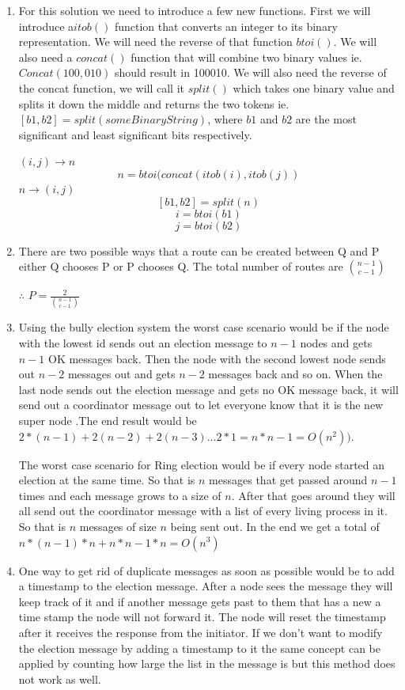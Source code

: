 \documentclass{article}
\begin{document}
\begin{enumerate}
\item For this solution we need to introduce a few new functions. First we will introduce a\( itob()\) function that converts an integer to its binary representation. We will need the reverse of that function \(btoi()\). We will also need a \(concat()\) function that will combine two binary values ie. \(Concat(100,010)\) should result in 100010.  We will also need the reverse of the concat function, we will call it \(split()\) which takes one binary value and splits it down the middle and returns the two tokens ie. \([b1,b2]=split(someBinaryString)\), where \( b1\) and \(b2\) are the most significant and least significant bits respectively.

\((i,j)\rightarrow n\)
\[
n=btoi(concat(itob(i),itob(j))
\]
\(n\rightarrow(i,j)\)
\[
[b1,b2]=split(n)
\]
\[
i=btoi(b1)
\]
\[
j=btoi(b2)
\]
	
\item
There are two possible ways that a route can be created between Q and P either Q chooses P or P chooses Q. The total number of routes are \( \binom{n-1}{c-1}\)

\centerline{\Large$ \therefore $
\(
 P= \frac {2}{\binom{n-1}{c-1}}
\)
}

\item Using the bully election system the worst case scenario would be if the node with the lowest id sends out an election message to \(n-1\) nodes and gets \(n-1\) OK messages back. Then the node with the second lowest node sends out \(n-2\) messages out and gets \(n-2\) messages back and so on. When the last node sends out the election message and gets no OK message back, it will send out a coordinator message out to let everyone know that it is the new super node .The end result would be \(2*(n-1)+2(n-2)+2(n-3)... 2*1= n*n-1 = O(n^2)) \).

The worst case scenario for Ring election would be if every node started an election at the same time. So that is \(n\) messages that get passed around \(n-1\) times and each message grows to a size of \(n\). After that goes around they will all send out the coordinator message with a list of every living process in it. So that is \(n\) messages of size \(n\) being sent out. In the end we get a total of  \(n*(n-1)*n+n*n-1*n =O(n^3)\)


\item One way to get rid of duplicate messages as soon as possible would be to add a timestamp to the election message. After a node sees the message they will keep track of it and if another message gets past to them that has a new a time stamp the node will not forward it. The node will reset the timestamp after it receives the response from the initiator. If we don’t want to modify the election message by adding a timestamp to it the same concept can be applied by counting how large the list in the message is but this method does not work as well.



\end{enumerate}
\end{document}
